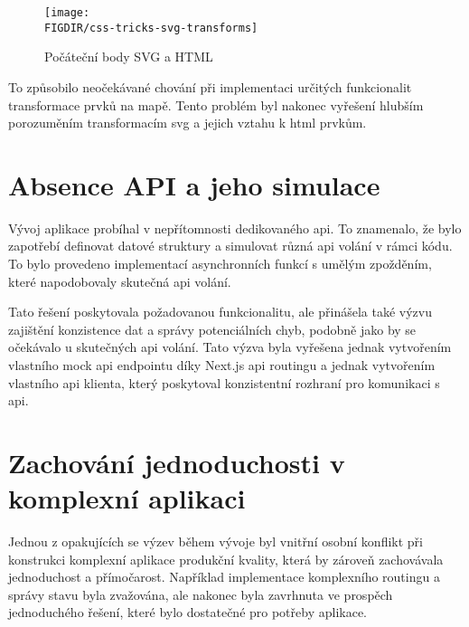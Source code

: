 \begin{figure}[H]
    \centering
    \texttt{[image: \\FIGDIR/css-tricks-svg-transforms]}
    \caption{Počáteční body SVG a HTML\cite{ct_css_tricks_com_transforms_on_svg_elements}}
    \label{fig:css-tricks-svg-transforms}
\end{figure}

To způsobilo neočekávané chování při implementaci určitých funkcionalit transformace prvků na mapě.
Tento problém byl nakonec vyřešení hlubším porozuměním transformacím \ac{svg} a jejich vztahu k \ac{html} prvkům.

\section{Absence API a jeho simulace}
\label{sec:vyzvy-a-problemy-absence-api}
Vývoj aplikace probíhal v nepřítomnosti dedikovaného \ac{api}.
To znamenalo, že bylo zapotřebí definovat datové struktury a simulovat různá \ac{api} volání v rámci kódu.
To bylo provedeno implementací asynchronních funkcí s umělým zpožděním, které napodobovaly skutečná \ac{api} volání.

Tato řešení poskytovala požadovanou funkcionalitu, ale přinášela také výzvu zajištění konzistence dat a správy potenciálních chyb, podobně jako by se očekávalo u skutečných \ac{api} volání.
Tato výzva byla vyřešena jednak vytvořením vlastního mock \ac{api} endpointu díky Next.js \ac{api} routingu\cite{n_basics_api_routes} a jednak vytvořením vlastního \ac{api} klienta, který poskytoval konzistentní rozhraní pro komunikaci s \ac{api}.

\section{Zachování jednoduchosti v komplexní aplikaci}
\label{sec:vyzvy-a-problemy-zachovani-jednoduchosti}
Jednou z opakujících se výzev během vývoje byl vnitřní osobní konflikt při konstrukci komplexní aplikace produkční kvality, která by zároveň zachovávala jednoduchost a přímočarost.
Například implementace komplexního routingu a správy stavu byla zvažována, ale nakonec byla zavrhnuta ve prospěch jednoduchého řešení, které bylo dostatečné pro potřeby aplikace.

